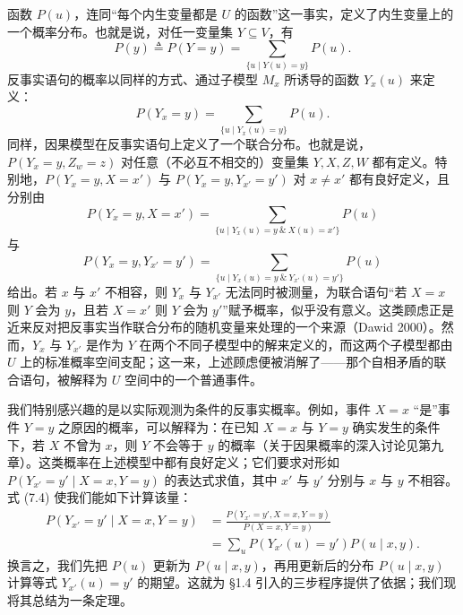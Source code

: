 函数 $P(u)$，连同“每个内生变量都是 $U$ 的函数”这一事实，定义了内生变量上的一个概率分布。也就是说，对任一变量集 $Y\subseteq V$，有
\begin{equation}
P(y)\triangleq P(Y=y)=\sum_{\{u\mid Y(u)=y\}}P(u). \tag{7.2}
\end{equation}
反事实语句的概率以同样的方式、通过子模型 $M_x$ 所诱导的函数 $Y_x(u)$ 来定义：
\begin{equation}
P(Y_x=y)=\sum_{\{u\mid Y_x(u)=y\}}P(u). \tag{7.3}
\end{equation}
同样，因果模型在反事实语句上定义了一个联合分布。也就是说，$P(Y_x=y,Z_w=z)$ 对任意（不必互不相交的）变量集 $Y,X,Z,W$ 都有定义。特别地，$P(Y_x=y,X=x')$ 与 $P(Y_x=y,Y_{x'}=y')$ 对 $x\ne x'$ 都有良好定义，且分别由
\begin{equation}
P(Y_x=y,X=x')=\sum_{\{u\mid Y_x(u)=y\ \&\ X(u)=x'\}}P(u) \tag{7.4}
\end{equation}
与
\begin{equation}
P(Y_x=y,Y_{x'}=y')=\sum_{\{u\mid Y_x(u)=y\ \&\ Y_{x'}(u)=y'\}}P(u) \tag{7.5}
\end{equation}
给出。若 $x$ 与 $x'$ 不相容，则 $Y_x$ 与 $Y_{x'}$ 无法同时被测量，为联合语句“若 $X=x$ 则 $Y$ 会为 $y$，且若 $X=x'$ 则 $Y$ 会为 $y'$”赋予概率，似乎没有意义。这类顾虑正是近来反对把反事实当作联合分布的随机变量来处理的一个来源（Dawid 2000）。然而，$Y_x$ 与 $Y_{x'}$ 是作为 $Y$ 在两个不同子模型中的解来定义的，而这两个子模型都由 $U$ 上的标准概率空间支配；这一来，上述顾虑便被消解了——那个自相矛盾的联合语句，被解释为 $U$ 空间中的一个普通事件。

我们特别感兴趣的是以实际观测为条件的反事实概率。例如，事件 $X=x$ “是”事件 $Y=y$ 之原因的概率，可以解释为：在已知 $X=x$ 与 $Y=y$ 确实发生的条件下，若 $X$ 不曾为 $x$，则 $Y$ 不会等于 $y$ 的概率（关于因果概率的深入讨论见第九章）。这类概率在上述模型中都有良好定义；它们要求对形如 $P(Y_{x'}=y'\mid X=x,Y=y)$ 的表达式求值，其中 $x'$ 与 $y'$ 分别与 $x$ 与 $y$ 不相容。式 \textup{(7.4)} 使我们能如下计算该量：
\begin{equation}
\begin{aligned}
P(Y_{x'}=y'\mid X=x,Y=y) &= \frac{P(Y_{x'}=y',X=x,Y=y)}{P(X=x,Y=y)}\\
&= \sum_{u}P(Y_{x'}(u)=y')P(u\mid x,y).
\end{aligned} \tag{7.6}
\end{equation}
换言之，我们先把 $P(u)$ 更新为 $P(u\mid x,y)$，再用更新后的分布 $P(u\mid x,y)$ 计算等式 $Y_{x'}(u)=y'$ 的期望。这就为 \S 1.4 引入的三步程序提供了依据；我们现将其总结为一条定理。

